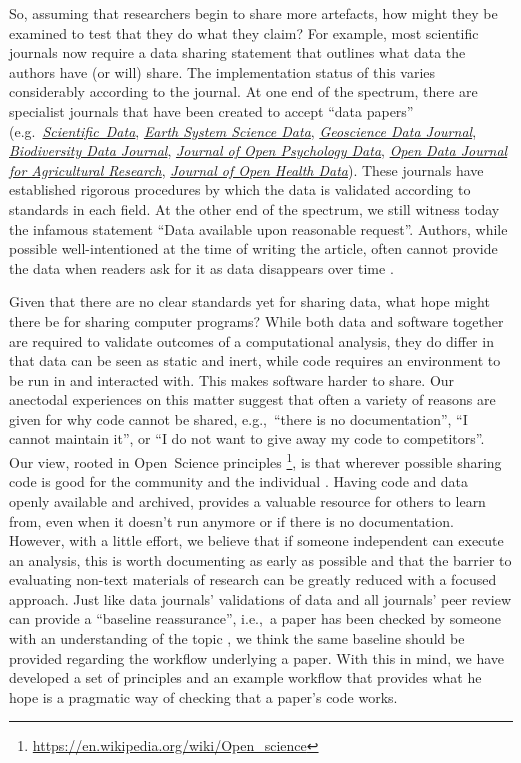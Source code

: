 \documentclass[12pt]{article}
\begin{document}
So, assuming that researchers begin to share more artefacts, how might
they be examined to test that they do what they claim? For example,
most scientific journals now require a data sharing statement that
outlines what data the authors have (or will) share.
The implementation status of this varies considerably according to the
journal. At one end of the spectrum, there are specialist journals that
have been created to accept ``data papers''
(e.g.~\href{https://www.nature.com/sdata/}{\emph{Scientific~Data}}, 
\href{https://essd.copernicus.org/}{\emph{Earth System Science Data}}, 
\href{https://rmets.onlinelibrary.wiley.com/journal/20496060}{\emph{Geoscience Data Journal}},
\href{https://bdj.pensoft.net/}{\emph{Biodiversity Data Journal}},
\href{https://openpsychologydata.metajnl.com/}{\emph{Journal of Open Psychology Data}},
\href{https://odjar.org/}{\emph{Open Data Journal for Agricultural Research}},
\href{https://openhealthdata.metajnl.com}{\emph{Journal of Open Health Data}}).
These journals have established rigorous procedures by which
the data is validated according to standards in each field. At the
other end of the spectrum, we still witness today the infamous
statement ``Data available upon reasonable request''. Authors,
while possible well-intentioned at the time of writing the article,
often cannot provide the data when readers ask for
it as data disappears over time \cite{Vines2014-hf}.

Given that there are no clear standards yet for sharing data, what hope
might there be for sharing computer programs? While both data and software
together are required to validate outcomes of a computational analysis,
they do differ in  that data can be seen as static and inert,
while code requires an environment to be run in and interacted with.
This makes software harder to share.
Our anectodal experiences
on this matter suggest that often a variety of reasons are given for why
code cannot be shared, e.g.,~``there is no documentation'', ``I cannot 
maintain it'', or ``I do not want to give away my code to competitors''.
Our view, rooted in Open~Science principles
\footnote{\url{https://en.wikipedia.org/wiki/Open_science}}, is that
wherever possible sharing code is good for the community and the 
individual \cite{Barnes2010-iv,markowetz_five_2015}.
Having code and data openly available and archived, 
provides a valuable resource for others to learn
from, even when it doesn't run anymore or if there is no documentation.
However,
with a little effort, we believe that if someone independent can execute
an analysis, this is worth documenting as early as possible and that the barrier
to evaluating non-text materials of research can be greatly reduced with a 
focused approach.
Just like data journals' validations of data and all journals' peer review
can provide a ``baseline reassurance'', i.e.,~a paper
has been checked by someone with an understanding of the topic
\cite{fyfe_mission_2019}, we think the same baseline should be provided
regarding the workflow underlying a paper.
With this in mind, we have developed a set of principles and an example 
workflow that provides what he hope is a pragmatic way of checking that a
paper's code works.
\end{document}
